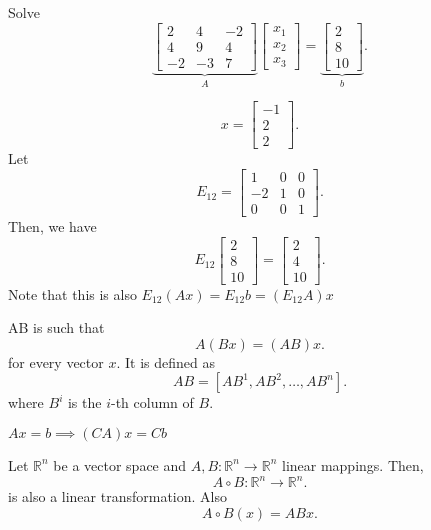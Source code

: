 
\begin{eg}
	Solve
	\[
		\underbrace{\begin{bmatrix}
			2 & 4 & -2 \\ 4 & 9 & 4 \\ -2 & -3 & 7
		\end{bmatrix}}_{A} \begin{bmatrix}
			x_{1} \\ x_{2} \\ x_{3}
		\end{bmatrix}
		= \underbrace{\begin{bmatrix}
			2 \\ 8 \\ 10
		\end{bmatrix}}_{b}
	.\] 
\end{eg}
\begin{explanation}
	\[
		x = \begin{bmatrix}
			-1 \\ 2 \\ 2
		\end{bmatrix}
	.\] 
	Let \[
		E_{12} = \begin{bmatrix}
			1 & 0 & 0 \\ -2 & 1 & 0 \\ 0 & 0 & 1
		\end{bmatrix}
	.\] Then, we have \[
		E_{12} \begin{bmatrix}
			2 \\ 8 \\ 10
		\end{bmatrix} = \begin{bmatrix}
			2 \\ 4 \\ 10
		\end{bmatrix}
	.\] Note that this is also \( E_{12}(Ax) = E_{12}b = (E_{12}A)x \)
\end{explanation}

\begin{definition}
	AB is such that \[
		A(Bx) = (AB)x
	.\] for every vector \( x \). It is defined as \[
	AB = [AB^1, AB^2, \ldots ,AB^n]
	.\] where \( B^{i}  \) is the \( i \)-th column of \( B \).
\end{definition}

\begin{theorem}
	\( Ax=b \implies (CA)x = Cb \)
\end{theorem}

\begin{theorem}
	Let \( \mathbb{R}^{n}  \) be a vector space and \( A,B : \mathbb{R}^{n} \to  \mathbb{R}^{n}   \) linear mappings. Then, \[
		A \circ B : \mathbb{R}^{n} \to  \mathbb{R}^{n}  
	.\] is also a linear transformation. Also \[
		A \circ B (x) = ABx
	.\] 
\end{theorem}

